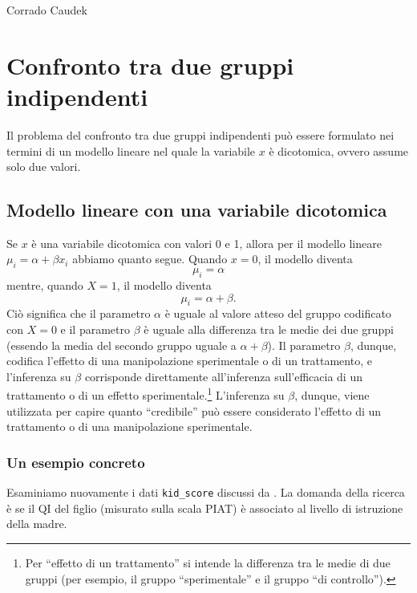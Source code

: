 \documentclass[
  10pt,
  italian,
  a4paper,
  extrafontsizes,onecolumn,openright
  ]{memoir}
\begin{document}
\bigskip

Corrado Caudek

\mainmatter

\hypertarget{comparison-two-means-stan}{%
\chapter{Confronto tra due gruppi indipendenti}\label{comparison-two-means-stan}}

Il problema del confronto tra due gruppi indipendenti può essere formulato nei termini di un modello lineare nel quale la variabile \(x\) è dicotomica, ovvero assume solo due valori.

\hypertarget{modello-lineare-con-una-variabile-dicotomica}{%
\section{Modello lineare con una variabile dicotomica}\label{modello-lineare-con-una-variabile-dicotomica}}

Se \(x\) è una variabile dicotomica con valori 0 e 1, allora per il modello lineare \(\mu_i = \alpha + \beta x_i\) abbiamo quanto segue. Quando \(x=0\), il modello diventa
\[
\mu_i = \alpha
\]
\noindent
mentre, quando \(X=1\), il modello diventa
\[
\mu_i = \alpha + \beta.
\]
\noindent
Ciò significa che il parametro \(\alpha\) è uguale al valore atteso del gruppo codificato con \(X=0\) e il parametro \(\beta\) è uguale alla differenza tra le medie dei due gruppi (essendo la media del secondo gruppo uguale a \(\alpha + \beta\)). Il parametro \(\beta\), dunque, codifica l'effetto di una manipolazione sperimentale o di un trattamento, e l'inferenza su \(\beta\) corrisponde direttamente all'inferenza sull'efficacia di un trattamento o di un effetto sperimentale.\footnote{Per ``effetto di un trattamento'' si intende la differenza tra le medie di due gruppi (per esempio, il gruppo ``sperimentale'' e il gruppo ``di controllo'').} L'inferenza su \(\beta\), dunque, viene utilizzata per capire quanto ``credibile'' può essere considerato l'effetto di un trattamento o di una manipolazione sperimentale.

\hypertarget{un-esempio-concreto}{%
\subsection{Un esempio concreto}\label{un-esempio-concreto}}

Esaminiamo nuovamente i dati \texttt{kid\_score} discussi da \textcite{gelman2020regression}. La domanda della ricerca è se il QI del figlio (misurato sulla scala PIAT) è associato al livello di istruzione della madre.
\end{document}
